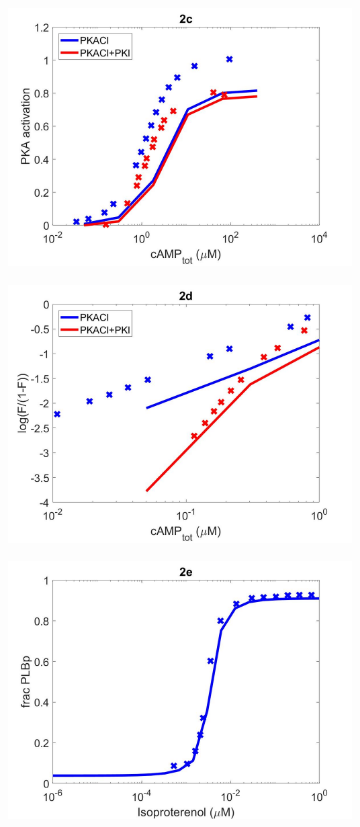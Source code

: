 \documentclass[fleqn,10pt]{physiome}
\begin{document}
\begin{figure}
\begin{subfigure}[b]{0.49\textwidth}
        \includegraphics[width=\textwidth]{figures/F2c.jpg}
    \end{subfigure}
    \hfill
    \begin{subfigure}[b]{0.49\textwidth}
        \centering
        \includegraphics[width=\textwidth]{figures/F2d.jpg}
    \end{subfigure}
    \hfill
    \begin{subfigure}[b]{0.49\textwidth}
        \centering
        \includegraphics[width=\textwidth]{figures/F2e.jpg}

\end{subfigure}
\end{figure}
\end{document}
